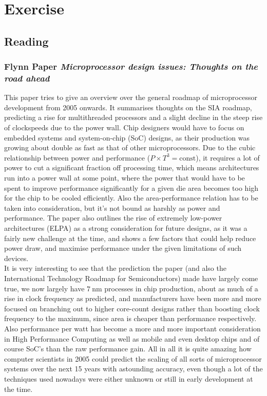 \documentclass[]{scrartcl}
\newcommand{\exercise}{Exercise \thesection}
\begin{document}
\section*{\exercise}
\subsection{Reading}
\subsubsection{Flynn Paper \textit{Microprocessor design issues: Thoughts on the road ahead}}
This paper tries to give an overview over the general roadmap of microprocessor development from 2005 onwards. It summarises thoughts on the SIA roadmap, predicting a rise for multithreaded processors and a slight decline in the steep rise of clockspeeds due to the power wall. Chip designers would have to focus on embedded systems and system-on-chip (SoC) designs, as their production was growing about double as fast as that of other microprocessors. Due to the cubic relationship between power and performance ($ P\times T^3 = \text{const} $), it requires a lot of power to cut a significant fraction off processing time, which means architectures run into a power wall at some point, where the power that would have to be spent to improve performance significantly for a given die area becomes too high for the chip to be cooled efficiently. 
Also the area-performance relation has to be taken into consideration, but it's not bound as harshly as power and performance. The paper also outlines the rise of extremely low-power architectures (ELPA) as a strong consideration for future designs, as it was a fairly new challenge at the time, and shows a few factors that could help reduce power draw, and maximise performance under the given limitations of such devices.
\\
It is very interesting to see that the prediction the paper (and also the International Technology Roadmap for Semiconductors) made have largely come true, we now largely have $ \SI{7}{\nano\meter} $ processes in chip production, about as much of a rise in clock frequency as predicted, and manufacturers have been more and more focused on branching out to higher core-count designs rather than boosting clock frequency to the maximum, since area is cheaper than performance respectively. Also performance per watt has become a more and more important consideration in High Performance Computing as well as mobile and even desktop chips and of course SoC's than the raw performance gain. All in all it is quite amazing how computer scientists in 2005 could predict the scaling of all sorts of microprocessor systems over the next 15 years with astounding accuracy, even though a lot of the techniques used nowadays were either unknown or still in early development at the time.
\end{document}
